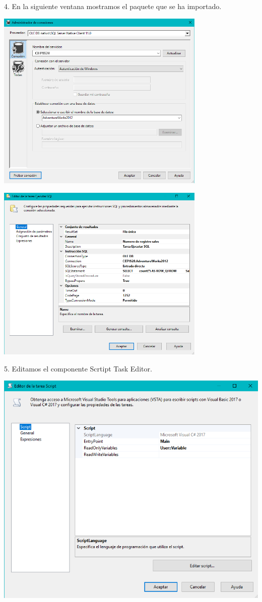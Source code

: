4. En la siguiente ventana mostramos el paquete que se ha importado.
	\begin{center}
	\includegraphics[width=10cm]{imagenes/img19}
    \end{center}	
    
	\begin{center}
	\includegraphics[width=10cm]{imagenes/img20}
	\end{center}	
	

5. Editamos el componente Scrtipt Task Editor.
    \begin{center}
	\includegraphics[width=10cmh]{imagenes/img21}
    \end{center}	
    
